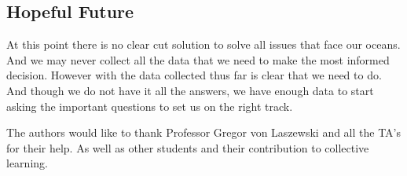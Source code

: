 \documentclass[sigconf]{acmart}
\begin{document}
\subsection{Hopeful Future}

At this point there is no clear cut solution to solve all issues that
face our oceans.  And we may never collect all the data that we need
to make the most informed decision.  However with the data collected
thus far is clear that we need to do. And though we do not have it all
the answers, we have enough data to start asking the important
questions to set us on the right track.
 
\begin{acks}

  The authors would like to thank Professor Gregor von Laszewski and
  all the TA's for their help.  As well as other students and their
  contribution to collective learning.

\end{acks}
 

 
 
\end{document}
